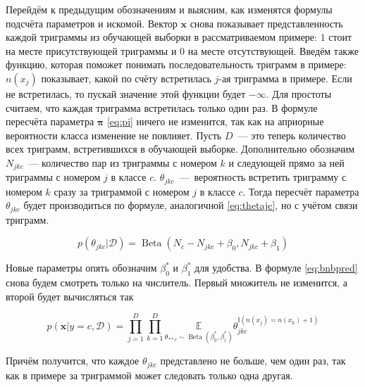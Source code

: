 Перейдём к предыдущим обозначениям и выясним, как изменятся формулы подсчёта параметров и
искомой. Вектор $\mathbf{x}$ снова показывает представленность каждой триграммы из обучающей
выборки в рассматриваемом примере: $1$ стоит на месте присутствующей триграммы и $0$ на месте
отсутствующей. Введём также функцию, которая поможет понимать последовательность триграмм в примере:
$n(x_{j})$ показывает, какой по счёту встретилась $j$-ая триграмма в примере. Если не встретилась,
то пускай значение этой функции будет $-\infty$. Для простоты считаем,
что каждая триграмма встретилась только один раз. В формуле пересчёта параметра $\mathbf{\pi}$ \ref{eq:pi} ничего не изменится, так как
на априорные вероятности класса изменение не повлияет. Пусть $D$~--- это теперь количество всех
триграмм, встретившихся в обучающей выборке. Дополнительно обозначим $N_{jkc}$~---
количество пар из триграммы с номером $k$ и следующей прямо за ней триграммы с номером $j$ в классе $c$.
$\theta_{jkc}$~---~вероятность встретить триграмму с номером $k$ сразу за триграммой с номером $j$ в
классе $c$. Тогда пересчёт параметра $\theta_{jkc}$ будет производиться по формуле, аналогичной
\ref{eq:thetajc}, но с учётом связи триграмм.

\begin{equation}
  p(\theta_{jkc}|\mathcal{D}) = \operatorname{Beta}(N_c-N_{jkc}+\beta_0, N_{jkc}+\beta_1)
  \label{eq:thetajkc}
\end{equation}

Новые параметры опять обозначим $\beta_0^*$ и $\beta_1^*$ для удобства. В формуле \ref{eq:bnbpred} снова будем смотреть только на числитель. Первый множитель не изменится,
а второй будет вычисляться так

\begin{equation}
   p(\mathbf{x}|y=c,\mathcal{D}) =
   \prod_{j=1}^D\prod_{k=1}^D\underset{\theta_{**c}\sim\operatorname{Beta}(\beta_0^*,\beta_1^*)}{\mathbb{E}}\theta_{jkc}^{\mathbb{I}(n(x_{j})=n(x_{k})+1)}
   \label{eq:maththetagr}
\end{equation}

Причём получится, что каждое $\theta_{jkc}$ представлено не больше, чем один раз, так как в примере
за триграммой может следовать только одна другая.
